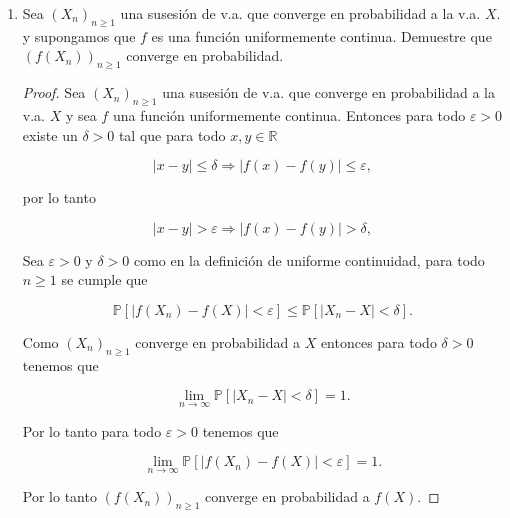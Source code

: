 \documentclass[letterpaper]{article}
\theoremstyle{definition}
\theoremstyle{lemathm}
\theoremstyle{lemathm}
\theoremstyle{lemathm}
\theoremstyle{lemademthm}
\newcommand{\limtoinf}[1]{\lim_{#1\to\infty}}
\newcommand{\abs}[1]{\left| #1 \right| }
\newcommand{\pars}[1]{\left( #1 \right) }
\newcommand{\bracs}[1]{\left[ #1 \right] }
\newcommand{\RR}{\mathbb{R}}
\newcommand{\PP}{\mathbb{P}}
\newcommand{\1}{\mathbbm{1}}
\begin{document}
\begin{enumerate}
\begin{proof}
			\[X_n \xrightarrow[]{c.s} X.\]

		\end{proof}
		
		\newpage

		\item Sea $\pars{X_n}_{n\geq 1}$ una susesión de v.a. que converge en probabilidad a la v.a. $X$. y supongamos que $f$ es una función uniformemente continua. Demuestre que $\pars{f\pars{X_n}}_{n\geq 1}$ converge en probabilidad.
		
		\begin{proof}
			
			Sea $\pars{X_n}_{n\geq 1}$ una susesión de v.a. que converge en probabilidad a la v.a. $X$ y sea $f$ una función uniformemente continua. Entonces para todo $\varepsilon > 0$ existe un $\delta > 0$ tal que para todo $x,y\in\RR$
			
			\[\abs{x - y} \leq \delta \Rightarrow \abs{f(x) - f(y)} \leq \varepsilon,\]

			por lo tanto

			\[\abs{x - y} > \varepsilon \Rightarrow \abs{f(x) - f(y)} > \delta,\]

			Sea $\varepsilon > 0$ y $\delta > 0$ como en la definición de uniforme continuidad, para todo $n\geq 1$ se cumple que

			\[\PP\bracs{\abs{f\pars{X_n} - f\pars{X}} < \varepsilon} \leq \PP\bracs{\abs{X_n - X} < \delta}.\]

			Como $\pars{X_n}_{n\geq 1}$ converge en probabilidad a $X$ entonces para todo $\delta > 0$ tenemos que

			\[\limtoinf{n}\PP\bracs{\abs{X_n - X} < \delta} = 1.\]

			Por lo tanto para todo $\varepsilon > 0$ tenemos que

			\[\limtoinf{n}\PP\bracs{\abs{f(X_n) - f(X)} < \varepsilon} = 1.\]

			Por lo tanto $\pars{f\pars{X_n}}_{n\geq 1}$ converge en probabilidad a $f(X)$.
		\end{proof}
	\end{enumerate}
\end{document}
